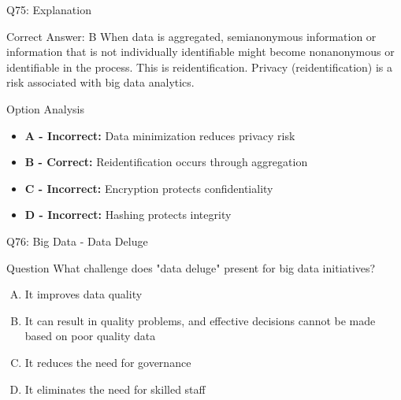 \documentclass{beamer}
\begin{document}
	\begin{frame}{Q75: Explanation}
		\begin{block}{Correct Answer: B}
			When data is aggregated, semianonymous information or information that is not individually identifiable might become nonanonymous or identifiable in the process. This is reidentification. Privacy (reidentification) is a risk associated with big data analytics.
		\end{block}
		\begin{block}{Option Analysis}
			\begin{itemize}
				\item \textbf{A - Incorrect:} Data minimization reduces privacy risk
				\item \textbf{B - Correct:} Reidentification occurs through aggregation
				\item \textbf{C - Incorrect:} Encryption protects confidentiality
				\item \textbf{D - Incorrect:} Hashing protects integrity
			\end{itemize}
		\end{block}
	\end{frame}
	
	\begin{frame}{Q76: Big Data - Data Deluge}
		\begin{block}{Question}
			What challenge does "data deluge" present for big data initiatives?
		\end{block}
		\begin{enumerate}[(A)]
			\item It improves data quality
			\item It can result in quality problems, and effective decisions cannot be made based on poor quality data
			\item It reduces the need for governance
			\item It eliminates the need for skilled staff
		\end{enumerate}
	\end{frame}
	
\end{document}

